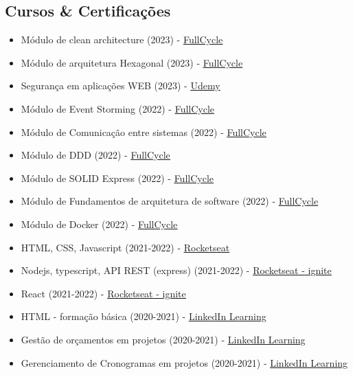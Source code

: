 \documentclass[11pt,a4paper,sans]{moderncv}
\begin{document}
\begin{samepage}
	\section{Cursos \& Certificações}
	 {\begin{itemize}[label=\textbullet]
		  \item Módulo de clean architecture (2023) - \underline{\color{blue}\href{https://fullcycle.com}{FullCycle}}
		  \item Módulo de arquitetura Hexagonal (2023) - \underline{\color{blue}\href{https://fullcycle.com}{FullCycle}}
		  \item Segurança em aplicações WEB (2023) - \underline{\color{blue}\href{https://udemy.com}{Udemy}}
		  \item Módulo de Event Storming (2022) - \underline{\color{blue}\href{https://fullcycle.com}{FullCycle}}
		  \item Módulo de Comunicação entre sistemas (2022) - \underline{\color{blue}\href{https://fullcycle.com}{FullCycle}}
		  \item Módulo de DDD (2022) - \underline{\color{blue}\href{https://fullcycle.com}{FullCycle}}
		  \item Módulo de SOLID Express (2022) - \underline{\color{blue}\href{https://fullcycle.com}{FullCycle}}
		  \item Módulo de Fundamentos de arquitetura de software (2022) - \underline{\color{blue}\href{https://fullcycle.com}{FullCycle}}
		  \item Módulo de Docker (2022) - \underline{\color{blue}\href{https://fullcycle.com}{FullCycle}}
		  \item HTML, CSS, Javascript (2021-2022) - \underline{\color{blue}\href{https://rocketseat.com.br}{Rocketseat}}
		  \item Nodejs, typescript, API REST (express) (2021-2022) - \underline{\color{blue}\href{https://rocketseat.com.br}{Rocketseat - ignite}}
		  \item React (2021-2022) - \underline{\color{blue}\href{https://rocketseat.com.br}{Rocketseat - ignite}}
		  \item HTML - formação básica (2020-2021) - \underline{\color{blue}\href{https://linkedin.com/learning}{LinkedIn Learning}}
		  \item Gestão de orçamentos em projetos (2020-2021) - \underline{\color{blue}\href{https://linkedin.com/learning}{LinkedIn Learning}}
		  \item Gerenciamento de Cronogramas em projetos (2020-2021) - \underline{\color{blue}\href{https://linkedin.com/learning}{LinkedIn Learning}}

\end{itemize}}
\end{samepage}
\end{document}
